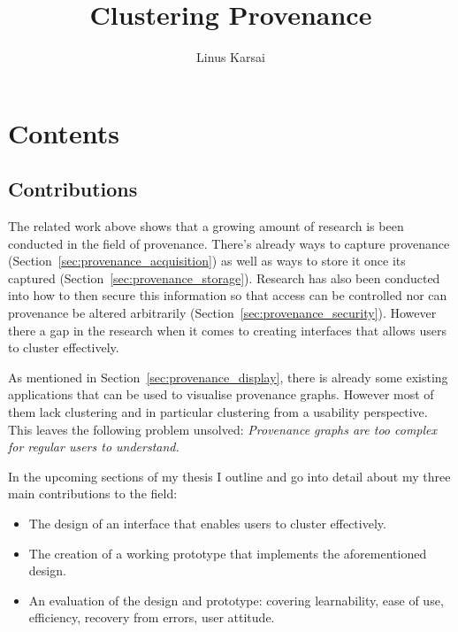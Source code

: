 \documentclass[BIT, graphvis, a4paper]{usydthesis}
\title{Clustering Provenance}
\begin{document}
\author{Linus Karsai}

\maketitle
\chapter*{Contents}

\startcontents[sections]


\newpage\setcounter{page}{1}



\section{Contributions}

The related work above shows that a growing amount of research is been conducted in the field of provenance. There's already ways to capture provenance (Section~\ref{sec:provenance_acquisition}) as well as ways to store it once its captured (Section~\ref{sec:provenance_storage}). Research has also been conducted into how to then secure this information so that access can be controlled nor can provenance be altered arbitrarily (Section~\ref{sec:provenance_security}). However there a gap in the research when it comes to creating interfaces that allows users to cluster effectively.

As mentioned in Section~\ref{sec:provenance_display}, there is already some existing applications that can be used to visualise provenance graphs. However most of them lack clustering and in particular clustering from a usability perspective. This leaves the following problem unsolved: \textit{Provenance graphs are too complex for regular users to understand.} 

In the upcoming sections of my thesis I outline and go into detail about my three main contributions to the field:

\begin{itemize}
	\item The design of an interface that enables users to cluster effectively.
	\item The creation of a working prototype that implements the aforementioned design.
	\item An evaluation of the design and prototype: covering learnability, ease of use, efficiency, recovery from errors, user attitude.
\end{itemize}
\end{document}
